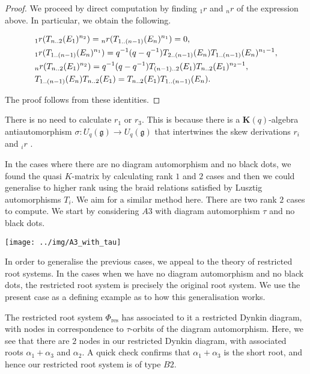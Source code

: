 \documentclass[a4 paper, 10pt]{article}
\begin{document}
\begin{proof}
We proceed by direct computation by finding $_{1}r$ and $_{n}r$ of the expression above. In particular, we obtain the following.

\begin{align}
	&{}_{1}r(T_{n..2}(E_1)^{n_2}) = {}{}_{n}r(T_{1..(n-1)}(E_n)^{n_1}) = 0, \\
	&{}_{1}r(T_{1..(n-1)}(E_n)^{n_1}) = q^{-1}(q-q^{-1})T_{2..(n-1)}(E_n)T_{1..(n-1)}(E_n)^{n_1 - 1}, \\
	&{}_{n}r(T_{n..2}(E_1)^{n_2}) = q^{-1}(q-q^{-1})T_{(n-1)..2}(E_1)T_{n..2}(E_1)^{n_2 - 1}, \\
	&T_{1..(n-1)}(E_n)T_{n..2}(E_1) = T_{n..2}(E_1)T_{1..(n-1)}(E_n).
\end{align}

\noindent The proof follows from these identities.
\end{proof}


\begin{remark}
There is no need to calculate $r_{1}$ or $r_{3}$. This is because there is a $\mathbf{K}(q)$-algebra antiautomorphism $\sigma: U_{q}(\mathfrak{g}) \rightarrow U_{q}(\mathfrak{g})$ \cite[Lemma 4.6]{b-Jantzen96} that intertwines the skew derivations $r_{i}$ and ${}_{i}r$ \cite[Eqn 2.2]{a-BK15} .
\end{remark}


In the cases where there are no diagram automorphism and no black dots, we found the quasi $K$-matrix by calculating rank $1$ and $2$ cases and then we could generalise to higher rank using the braid relations satisfied by Lusztig automorphisms $T_i$. We aim for a similar method here. There are two rank $2$ cases to compute. We start by considering $A3$ with diagram automorphism $\tau$ and no black dots. 

\begin{center}
\texttt{[image: ../img/A3\_with\_tau]}
\end{center}

\noindent In order to generalise the previous cases, we appeal to the theory of restricted root systems. In the cases when we have no diagram automorphism and no black dots, the restricted root system is precisely the original root system. We use the present case as a defining example as to how this generalisation works.


The restricted root system $\Phi_{\text{res}}$ has associated to it a restricted Dynkin diagram, with nodes in correspondence to $\tau$-orbits of the diagram automorphism. Here, we see that there are $2$ nodes in our restricted Dynkin diagram, with associated roots $\alpha_1 + \alpha_3$ and $\alpha_2$. A quick check confirms that $\alpha_1 + \alpha_3$ is the short root, and hence our restricted root system is of type $B2$. 
\end{document}
